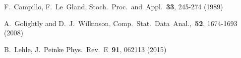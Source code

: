 \documentclass[aps,twocolumn,superscriptaddress,showpacs,showkeys]{revtex4}
\begin{document}
{\begin{thebibliography}{00}
    F.~Campillo, F.~Le~Gland,
                        Stoch.~Proc.~and~Appl.~{\bf 33}, 245-274 (1989)








  A.~Golightly and D.~J.~Wilkinson,
                       Comp.~Stat.~Data~Anal.,~{\bf 52}, 1674-1693 (2008)





        B.~Lehle, J.~Peinke
                         Phys.~Rev.~E~{\bf 91}, 062113 (2015)



\end{thebibliography}}
\end{document}
